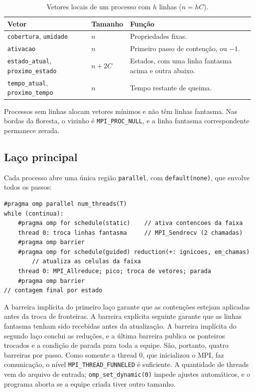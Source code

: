 \documentclass[11pt,a4paper]{article}
\begin{document}
\begin{table}[H]
\centering
\caption{Vetores locais de um processo com $h$ linhas ($n=hC$).}
\begin{tabularx}{\linewidth}{llX}
\toprule
\textbf{Vetor} & \textbf{Tamanho} & \textbf{Função} \\
\midrule
\texttt{cobertura}, \texttt{umidade} & $n$ & Propriedades fixas. \\
\texttt{ativacao} & $n$ & Primeiro passo de contenção, ou $-1$. \\
\texttt{estado\_atual}, \texttt{proximo\_estado} & $n+2C$ & Estados, com uma linha fantasma acima e outra abaixo. \\
\texttt{tempo\_atual}, \texttt{proximo\_tempo} & $n$ & Tempo restante de queima. \\
\bottomrule
\end{tabularx}
\end{table}

Processos sem linhas alocam vetores mínimos e não têm linhas fantasma. Nas
bordas da floresta, o vizinho é \texttt{MPI\_PROC\_NULL}, e a linha fantasma
correspondente permanece zerada.

\subsection{Laço principal}

Cada processo abre uma única região \texttt{parallel}, com
\texttt{default(none)}, que envolve todos os passos:

\begin{lstlisting}
#pragma omp parallel num_threads(T)
while (continua):
    #pragma omp for schedule(static)    // ativa contencoes da faixa
    thread 0: troca linhas fantasma     // MPI_Sendrecv (2 chamadas)
    #pragma omp barrier
    #pragma omp for schedule(guided) reduction(+: ignicoes, em_chamas)
        // atualiza as celulas da faixa
    thread 0: MPI_Allreduce; pico; troca de vetores; parada
    #pragma omp barrier
// contagem final por estado
\end{lstlisting}

A barreira implícita do primeiro laço garante que as contenções estejam
aplicadas antes da troca de fronteiras. A barreira explícita seguinte
garante que as linhas fantasma tenham sido recebidas antes da atualização.
A barreira implícita do segundo laço conclui as reduções, e a última
barreira publica os ponteiros trocados e a condição de parada para toda a
equipe. São, portanto, quatro barreiras por passo. Como somente a thread 0,
que inicializou o MPI, faz comunicação, o nível
\texttt{MPI\_THREAD\_FUNNELED} é suficiente. A quantidade de threads vem do
arquivo de entrada; \texttt{omp\_set\_dynamic(0)} impede ajustes
automáticos, e o programa aborta se a equipe criada tiver outro tamanho.
\end{document}
